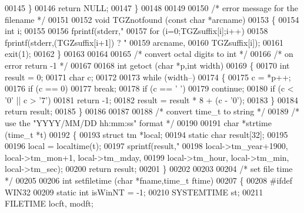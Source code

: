 \begin{DoxyCode}
00145     \}
00146   \textcolor{keywordflow}{return} NULL;
00147 \}
00148 
00149 
00150 \textcolor{comment}{/* error message for the filename */}
00151 
00152 \textcolor{keywordtype}{void} TGZnotfound (\textcolor{keyword}{const} \textcolor{keywordtype}{char} *arcname)
00153 \{
00154   \textcolor{keywordtype}{int} i;
00155 
00156   fprintf(stderr,\textcolor{stringliteral}{"%
00157   \textcolor{keywordflow}{for} (i=0;TGZsuffix[i];i++)
00158     fprintf(stderr,(TGZsuffix[i+1]) ? \textcolor{stringliteral}{"%
00159             arcname,
00160             TGZsuffix[i]);
00161   exit(1);
00162 \}
00163 
00164 
00165 \textcolor{comment}{/* convert octal digits to int */}
00166 \textcolor{comment}{/* on error return -1 */}
00167 
00168 \textcolor{keywordtype}{int} getoct (\textcolor{keywordtype}{char} *p,\textcolor{keywordtype}{int} width)
00169 \{
00170   \textcolor{keywordtype}{int} result = 0;
00171   \textcolor{keywordtype}{char} c;
00172 
00173   \textcolor{keywordflow}{while} (width--)
00174     \{
00175       c = *p++;
00176       \textcolor{keywordflow}{if} (c == 0)
00177         \textcolor{keywordflow}{break};
00178       \textcolor{keywordflow}{if} (c == \textcolor{charliteral}{' '})
00179         \textcolor{keywordflow}{continue};
00180       \textcolor{keywordflow}{if} (c < '0' || c > \textcolor{charliteral}{'7'})
00181         \textcolor{keywordflow}{return} -1;
00182       result = result * 8 + (c - \textcolor{charliteral}{'0'});
00183     \}
00184   \textcolor{keywordflow}{return} result;
00185 \}
00186 
00187 
00188 \textcolor{comment}{/* convert time\_t to string */}
00189 \textcolor{comment}{/* use the "YYYY/MM/DD hh:mm:ss" format */}
00190 
00191 \textcolor{keywordtype}{char} *strtime (time\_t *t)
00192 \{
00193   \textcolor{keyword}{struct }tm   *local;
00194   \textcolor{keyword}{static} \textcolor{keywordtype}{char} result[32];
00195 
00196   local = localtime(t);
00197   sprintf(result,\textcolor{stringliteral}{"%
00198           local->tm\_year+1900, local->tm\_mon+1, local->tm\_mday,
00199           local->tm\_hour, local->tm\_min, local->tm\_sec);
00200   \textcolor{keywordflow}{return} result;
00201 \}
00202 
00203 
00204 \textcolor{comment}{/* set file time */}
00205 
00206 \textcolor{keywordtype}{int} setfiletime (\textcolor{keywordtype}{char} *fname,time\_t ftime)
00207 \{
00208 \textcolor{preprocessor}{#ifdef WIN32}
00209   \textcolor{keyword}{static} \textcolor{keywordtype}{int} isWinNT = -1;
00210   SYSTEMTIME st;
00211   FILETIME locft, modft;
}}}
\end{DoxyCode}
